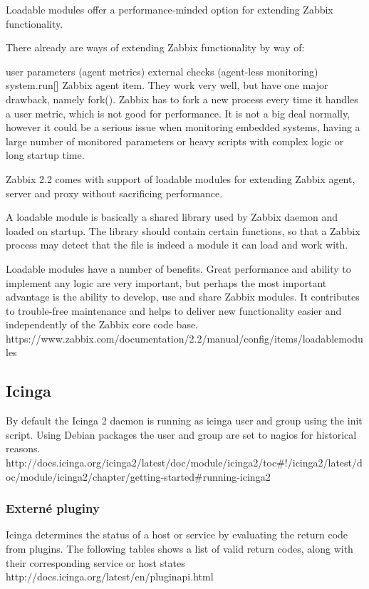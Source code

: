 \documentclass[11pt,final,oneside]{fithesis}
\begin{document}
Loadable modules offer a performance-minded option for extending Zabbix functionality.

There already are ways of extending Zabbix functionality by way of:

user parameters (agent metrics)
external checks (agent-less monitoring)
system.run[] Zabbix agent item.
They work very well, but have one major drawback, namely fork(). Zabbix has to fork a new process every time it handles a user metric, which is not good for performance. It is not a big deal normally, however it could be a serious issue when monitoring embedded systems, having a large number of monitored parameters or heavy scripts with complex logic or long startup time.

Zabbix 2.2 comes with support of loadable modules for extending Zabbix agent, server and proxy without sacrificing performance.

A loadable module is basically a shared library used by Zabbix daemon and loaded on startup. The library should contain certain functions, so that a Zabbix process may detect that the file is indeed a module it can load and work with.

Loadable modules have a number of benefits. Great performance and ability to implement any logic are very important, but perhaps the most important advantage is the ability to develop, use and share Zabbix modules. It contributes to trouble-free maintenance and helps to deliver new functionality easier and independently of the Zabbix core code base.
https://www.zabbix.com/documentation/2.2/manual/config/items/loadablemodules


\subsection{Icinga}
By default the Icinga 2 daemon is running as icinga user and group using the init script. Using Debian packages the user and group are set to nagios for historical reasons.
http://docs.icinga.org/icinga2/latest/doc/module/icinga2/toc#!/icinga2/latest/doc/module/icinga2/chapter/getting-started#running-icinga2

\subsubsection{Externé pluginy}
Icinga determines the status of a host or service by evaluating the return code from plugins. The following tables shows a list of valid return codes, along with their corresponding service or host states
http://docs.icinga.org/latest/en/pluginapi.html
\end{document}
